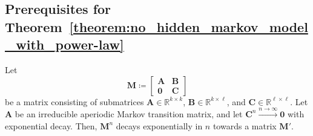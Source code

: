 \documentclass[../../main.tex]{subfiles}
\begin{document}
\subsection{Prerequisites for Theorem~\ref{theorem:no_hidden_markov_model_with_power-law}}
\label{section:prerequisites_for_theorem}
\begin{lemma}
    \label{lemma:exponential_convergence_with_open_states}
    Let
    \[
        \bm{M} \coloneqq
        \begin{bmatrix}
            \bm{A} & \bm{B} \\
            \bm{0} & \bm{C}
        \end{bmatrix}
    \]
    be a matrix consisting of submatrices \( \bm{A} \in \mathbb{R}^{k \times k} \), \( \bm{B} \in \mathbb{R}^{k \times \ell} \), and \( \bm{C} \in \mathbb{R}^{\ell \times \ell} \). Let $\bm{A}$ be an irreducible aperiodic Markov transition matrix, and let $\bm{C}^n \xrightarrow{n \to \infty} \bm{0}$ with exponential decay.
    Then, $\bm{M}^n$ decays exponentially in $n$ towards a matrix $\bm{M}'$.
\end{lemma}
\end{document}
